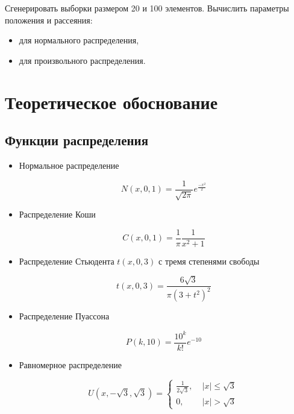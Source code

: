 \documentclass[12pt,a4paper]{article}
\begin{document}
	Сгенерировать выборки размером 20 и 100 элементов. Вычислить параметры положения и рассеяния:

	\begin{itemize}
		\item для нормального распределения,
		\item для произвольного распределения.
	\end{itemize}

	\section{Теоретическое обоснование}

	\subsection{Функции распределения}

	\begin{itemize}
		\item Нормальное распределение

		\begin{equation} \label{eq:normal}
			N(x, 0, 1) = \frac{1}{\sqrt{2\pi}}e^\frac{-x^2}{2}
		\end{equation}

		\item Распределение Коши

		\begin{equation} \label{eq:cauchy}
			C(x, 0, 1) = \frac{1}{\pi}\frac{1}{x^2+1}
		\end{equation}

		\item Распределение Стьюдента $t(x, 0, 3)$ с тремя степенями свободы

		\begin{equation} \label{eq:student}
			t(x, 0, 3) = \frac{6\sqrt3}{\pi(3 + t^2)^2}
		\end{equation}

		\item Распределение Пуассона

		\begin{equation} \label{eq:poisson}
			P(k, 10) = \frac{10^k}{k!}e^{-10}
		\end{equation}

		\item Равномерное распределение

		\begin{equation} \label{eq:uniform}
			U(x, -\sqrt3, \sqrt3) = \begin{cases}
				\frac{1}{2\sqrt3}, & \; |x| \leq \sqrt3\\
				0, & \; |x| > \sqrt3
			\end{cases}
		\end{equation}
	\end{itemize}
\end{document}
